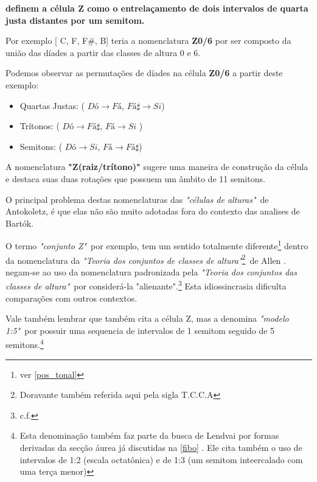 \documentclass[
	12pt,				%
	openright,			%
	twoside,			%
	a4paper,			%
	english,			%
	french,				%
	spanish,			%
	brazil				%
	]{abntex2}
\begin{document}
 \textbf{definem a célula Z como o entrelaçamento de dois intervalos de quarta justa distantes por um semitom.} 

Por exemplo [ C, F, F\#, B] teria a nomenclatura \textbf{Z0/6} por ser composto da união das díades a partir das classes de altura 0 e 6. 

Podemos observar as permutações de díades na célula \textbf{Z0/6} a partir deste exemplo:

\begin{itemize}
\item Quartas Justas: ( $Dó \rightarrow Fá$, $Fá\sharp \rightarrow Si$) 

\item Trítonos: ( $Dó \rightarrow Fá\sharp$, $Fá \rightarrow Si$ )

\item Semitons: ( $Dó \rightarrow Si$, $Fá \rightarrow Fá\sharp$)
\end{itemize}


A nomenclatura \textbf{"Z(raiz/trítono)"} sugere uma maneira de construção da célula e destaca suas duas rotações que possuem um âmbito de 11 semitons. 

O principal problema destas nomenclaturas das \textit{"células de alturas"}\ de Antokoletz, é que elas não são muito adotadas fora do contexto das analises de Bartók.

O termo \textit{"conjunto Z"}\, por exemplo, tem um sentido totalmente diferente\footnote{ver \autoref{pos_tonal} } dentro da nomenclatura da  \textit{"Teoria dos conjuntos de classes de altura"}\footnote{Doravante também referida aqui pela sigla T.C.C.A}\ de Allen .  negam-se ao uso da nomenclatura padronizada pela \textit{"Teoria dos conjuntos das classes de altura"}\ por considerá-la "alienante".\footnote{c.f. } Esta idiossincrasia dificulta comparações com outros contextos.

Vale também lembrar que \cite[ p.51]{lendvai1971bela} também cita a célula Z, mas a denomina \textit{"modelo 1:5"}\ por possuir uma sequencia de intervalos de 1 semitom seguido de 5 semitons.\footnote{Esta denominação também faz parte da busca de Lendvai por formas derivadas da secção áurea já discutidas na \autoref{fibo} . Ele cita também o uso de intervalos de 1:2 (escala octatônica) e de 1:3 (um semitom inteercalado com uma terça menor) } 
\end{document}
